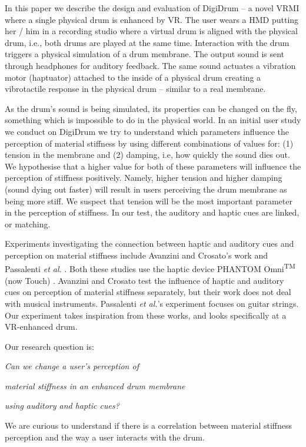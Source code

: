 \documentclass{article}
\begin{document}
In this paper we describe the design and evaluation of DigiDrum -- a novel VRMI where a single physical drum is enhanced by VR. The user wears a HMD putting her / him in a recording studio where a virtual drum is aligned with the physical drum, i.e., both drums are played at the same time. Interaction with the drum triggers a physical simulation of a drum membrane. The output sound is sent through headphones for auditory feedback. The same sound actuates a vibration motor (haptuator) attached to the inside of a physical drum creating a vibrotactile response in the physical drum -- similar to a real membrane.

As the drum's sound is being simulated, its properties can be changed on the fly, something which is impossible to do in the physical world. In an initial user study we conduct on DigiDrum we try to understand which parameters influence the perception of material stiffness by using different combinations of values for: (1) tension in the membrane and (2) damping, i.e, how quickly the sound dies out. We hypothesise that a higher value for both of these parameters will influence the perception of stiffness positively. Namely, higher tension and higher damping (sound dying out faster) will result in users perceiving the drum membrane as being more stiff. We suspect that tension will be the most important parameter in the perception of stiffness. In our test, the auditory and haptic cues are linked, or matching. 

Experiments investigating the connection between haptic and auditory cues and perception on material stiffness include
Avanzini and Crosato's work \cite{avanzini2006} and Passalenti \emph{et al.}  \cite{passalenti2019}. Both these studies use the haptic device PHANTOM\textregistered{} Omni\textsuperscript{TM} (now Touch) \cite{phantom}. Avanzini and Crosato test the influence of haptic and auditory cues on perception of material stiffness separately, but their work does not deal with musical instruments. Passalenti \emph{et al.}'s experiment focuses on guitar strings. Our experiment takes inspiration from these works, and looks specifically at a VR-enhanced drum.

Our research question is:
\vspace{0.2cm}

\centerline{\it Can we change a user's perception of}

\centerline{\it material stiffness in an enhanced drum membrane}

\centerline{\it using auditory and haptic cues?}
\vspace{0.2cm}
\noindent We are curious to understand if there is a correlation between material stiffness perception and the way a user interacts with the drum. 
\end{document}
